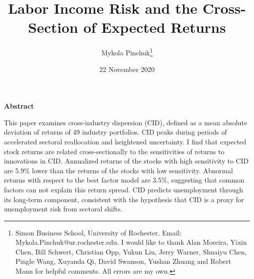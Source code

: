 \documentclass[12pt]{article}
\begin{document}
\onehalfspacing      %
\renewcommand{\footnote}{\endnote}  %

\author{\large{Mykola Pinchuk}\thanks{\rm Simon Business School, University of Rochester. Email: Mykola.Pinchuk@ur.rochester.edu. \newline I would like to thank Alan Moreira, Yixin Chen, Bill Schwert, Christian Opp, Yukun Liu, Jerry Warner, Shuaiyu Chen, Pingle Wang, Xuyanda Qi, David Swanson, Yushan Zhuang and Robert Mann for helpful comments. All errors are my own.}}

\title{\bf Labor Income Risk and the Cross-Section of Expected Returns}

\date{22 November 2020}  

\maketitle
\thispagestyle{empty}

\bigskip

\normalsize
\vspace{1cm}

\centerline{\bf Abstract}

\vspace{0.5cm}

\begin{onehalfspace}  %
  \noindent This paper examines cross-industry dispersion (CID), defined as a mean absolute deviation of returns of 49 industry portfolios. CID peaks during periods of accelerated sectoral reallocation and heightened uncertainty. I find that expected stock returns are related cross-sectionally to the sensitivities of returns to innovations in CID. Annualized returns of the stocks with high sensitivity to CID are 5.9\% lower than the returns of the stocks with low sensitivity. Abnormal returns with respect to the best factor model are 3.5\%, suggesting that common factors can not explain this return spread. CID predicts unemployment through its long-term component, consistent with the hypothesis that CID is a proxy for unemployment risk from sectoral shifts. 
\end{onehalfspace}
\medskip


\clearpage
{}
\end{document}
